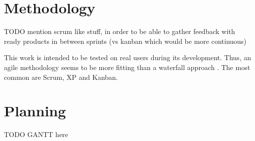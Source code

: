 \section{Methodology}

TODO
mention scrum like stuff, in order to be able to gather feedback with ready products in between sprints (vs kanban which would be more continuous)


This work is intended to be tested on real users during its development. Thus, an agile methodology seems to be more fitting than a waterfall approach \cite{beck2001agile}. The most common are Scrum, XP and Kanban.

\section{Planning}

TODO
GANTT here
